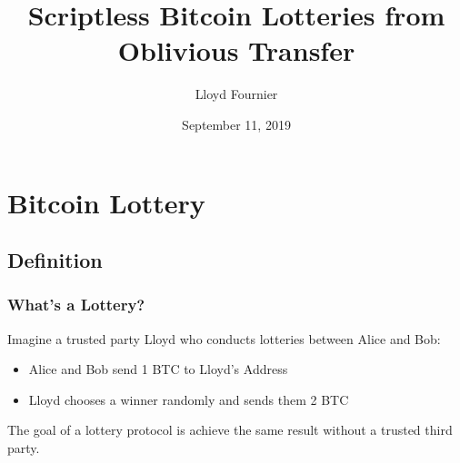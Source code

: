 \documentclass{beamer}
\title[Scriptless Lotteries]{Scriptless Bitcoin Lotteries from Oblivious Transfer} %
\author{Lloyd Fournier} %
\institute[Scaling Bitcoin 2019] %
{
\\ %
\medskip
\textit{lloyd.fourn@gmail.com} %
}
\date{September 11, 2019} %
\begin{document}
\begin{frame}
\titlepage %
\end{frame}



\section{Bitcoin Lottery} %

\subsection{Definition} %

\begin{frame}
\frametitle{What's a Lottery?}
Imagine a trusted party Lloyd who conducts lotteries between Alice and Bob:
\begin{itemize}
    \item Alice and Bob send 1 BTC to Lloyd's Address
    \item Lloyd chooses a winner randomly and sends them 2 BTC
\end{itemize}
\vspace{1em}

The goal of a lottery protocol is achieve the same result without a trusted third party.
\end{frame}
\end{document}
